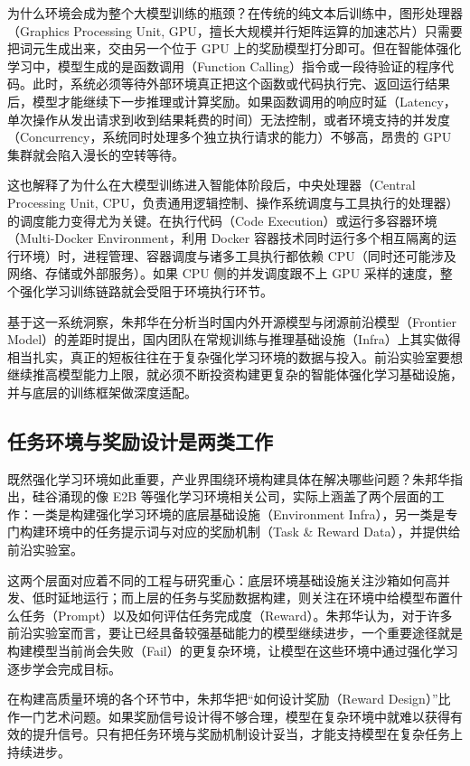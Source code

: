 \documentclass[UTF8,a4paper,11pt,fontset=fandol]{ctexart}
\begin{document}
为什么环境会成为整个大模型训练的瓶颈？在传统的纯文本后训练中，图形处理器（Graphics Processing Unit, GPU，擅长大规模并行矩阵运算的加速芯片）只需要把词元生成出来，交由另一个位于 GPU 上的奖励模型打分即可。但在智能体强化学习中，模型生成的是函数调用（Function Calling）指令或一段待验证的程序代码。此时，系统必须等待外部环境真正把这个函数或代码执行完、返回运行结果后，模型才能继续下一步推理或计算奖励。如果函数调用的响应时延（Latency，单次操作从发出请求到收到结果耗费的时间）无法控制，或者环境支持的并发度（Concurrency，系统同时处理多个独立执行请求的能力）不够高，昂贵的 GPU 集群就会陷入漫长的空转等待。

这也解释了为什么在大模型训练进入智能体阶段后，中央处理器（Central Processing Unit, CPU，负责通用逻辑控制、操作系统调度与工具执行的处理器）的调度能力变得尤为关键。在执行代码（Code Execution）或运行多容器环境（Multi-Docker Environment，利用 Docker 容器技术同时运行多个相互隔离的运行环境）时，进程管理、容器调度与诸多工具执行都依赖 CPU（同时还可能涉及网络、存储或外部服务）。如果 CPU 侧的并发调度跟不上 GPU 采样的速度，整个强化学习训练链路就会受阻于环境执行环节。

基于这一系统洞察，朱邦华在分析当时国内外开源模型与闭源前沿模型（Frontier Model）的差距时提出，国内团队在常规训练与推理基础设施（Infra）上其实做得相当扎实，真正的短板往往在于复杂强化学习环境的数据与投入。前沿实验室要想继续推高模型能力上限，就必须不断投资构建更复杂的智能体强化学习基础设施，并与底层的训练框架做深度适配。

\subsection{任务环境与奖励设计是两类工作}
既然强化学习环境如此重要，产业界围绕环境构建具体在解决哪些问题？朱邦华指出，硅谷涌现的像 E2B 等强化学习环境相关公司，实际上涵盖了两个层面的工作：一类是构建强化学习环境的底层基础设施（Environment Infra），另一类是专门构建环境中的任务提示词与对应的奖励机制（Task \& Reward Data），并提供给前沿实验室。

这两个层面对应着不同的工程与研究重心：底层环境基础设施关注沙箱如何高并发、低时延地运行；而上层的任务与奖励数据构建，则关注在环境中给模型布置什么任务（Prompt）以及如何评估任务完成度（Reward）。朱邦华认为，对于许多前沿实验室而言，要让已经具备较强基础能力的模型继续进步，一个重要途径就是构建模型当前尚会失败（Fail）的更复杂环境，让模型在这些环境中通过强化学习逐步学会完成目标。

在构建高质量环境的各个环节中，朱邦华把“如何设计奖励（Reward Design）”比作一门艺术问题。如果奖励信号设计得不够合理，模型在复杂环境中就难以获得有效的提升信号。只有把任务环境与奖励机制设计妥当，才能支持模型在复杂任务上持续进步。
\end{document}
